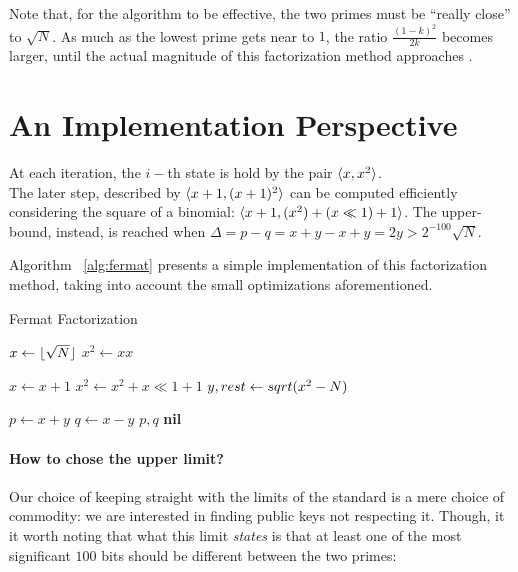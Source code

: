 \begin{remark}
  Note that, for the algorithm to be effective, the two primes must be
  ``really close'' to $\sqrt{N}$. As much as the lowest prime gets near to
  $1$, the ratio $\frac{(1-k)^2}{2k}$ becomes larger, until the actual magnitude
  of this factorization method approaches .
\end{remark}

\section{An Implementation Perspective}

At each iteration, the $i-$th state is hold by the pair $\langle x, x^2\rangle$.\\
The later step, described by $\langle x+1, (x+1)^2\rangle$ can be computed efficiently
considering the square of a binomial: $\langle x+1, (x^2) + (x \ll 1) + 1\rangle$.
The upper-bound, instead, is reached when
$ \Delta = p - q  = x + y - x + y = 2y > 2^{-100}\sqrt{N}$.

Algorithm ~\ref{alg:fermat} presents a simple implementation of this
factorization method, taking into account the small optimizations
aforementioned.

\begin{algorithm}[H]
  \caption{Fermat Factorization \label{alg:fermat}}
  \begin{algorithmic}[1]
    \State $x \gets \lfloor\sqrt{N}\rfloor$
    \State $x^2 \gets xx$

    \Repeat
    \State $x \gets x+1$
    \State $x^2 \gets x^2 + x \ll 1 + 1$
    \State $y, rest \gets sqrt(x^2 - N)$

    \State $p \gets x+y$
    \State $q \gets x-y$
    \State \Return $p, q$
    \Else
    \State \Return \textbf{nil}
    \EndIf
    \end{algorithmic}
\end{algorithm}

\paragraph{How to chose the upper limit?}  Our choice of keeping straight with
the limits of the standard is a mere choice of commodity: we are interested in
finding public keys  not respecting it. Though, it it worth noting that what this
limit \emph{states} is that at least one of the most significant $100$ bits
should be different between the two primes:

